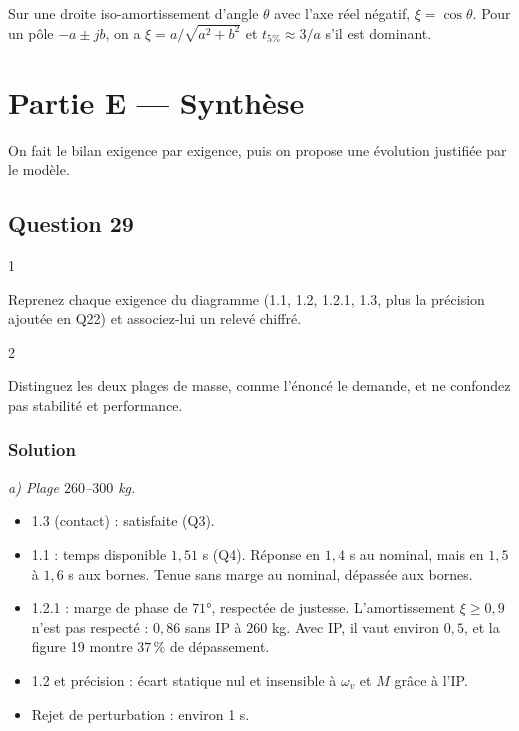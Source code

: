 \documentclass[11pt,a4paper]{article}
\providecommand{\tightlist}{\setlength{\itemsep}{0pt}\setlength{\parskip}{0pt}}
\renewcommand{\geq}{\geqslant}
\begin{document}
\begin{methode}

Sur une droite iso-amortissement d'angle \(\theta\) avec l'axe réel négatif, \(\xi=\cos\theta\). Pour un pôle \(-a\pm jb\), on a \(\xi=a/\sqrt{a^2+b^2}\) et \(t_{5\%}\approx3/a\) s'il est dominant.

\end{methode}

\hypertarget{partie-e-synthuxe8se}{%
\section{Partie E --- Synthèse}\label{partie-e-synthuxe8se}}

On fait le bilan exigence par exigence, puis on propose une évolution justifiée par le modèle.

\hypertarget{question-29}{%
\subsection{Question 29}\label{question-29}}

\begin{indication}{1}

Reprenez chaque exigence du diagramme (1.1, 1.2, 1.2.1, 1.3, plus la précision ajoutée en Q22) et associez-lui un relevé chiffré.

\end{indication}

\begin{indication}{2}

Distinguez les deux plages de masse, comme l'énoncé le demande, et ne confondez pas stabilité et performance.

\end{indication}

\hypertarget{solution-28}{%
\subsubsection{Solution}\label{solution-28}}

\emph{a) Plage \(260\)--\(300\) kg.}

\begin{itemize}
\tightlist
\item
  1.3 (contact) : satisfaite (Q3).
\item
  1.1 : temps disponible \(1{,}51\) s (Q4). Réponse en \(1{,}4\) s au nominal, mais en \(1{,}5\) à \(1{,}6\) s aux bornes. Tenue sans marge au nominal, dépassée aux bornes.
\item
  1.2.1 : marge de phase de \(71°\), respectée de justesse. L'amortissement \(\xi\geq0{,}9\) n'est pas respecté : \(0{,}86\) sans IP à \(260\) kg. Avec IP, il vaut environ \(0{,}5\), et la figure 19 montre \(37\,\%\) de dépassement.
\item
  1.2 et précision : écart statique nul et insensible à \(\omega_v\) et \(M\) grâce à l'IP.
\item
  Rejet de perturbation : environ 1 s.
\end{itemize}
\end{document}
